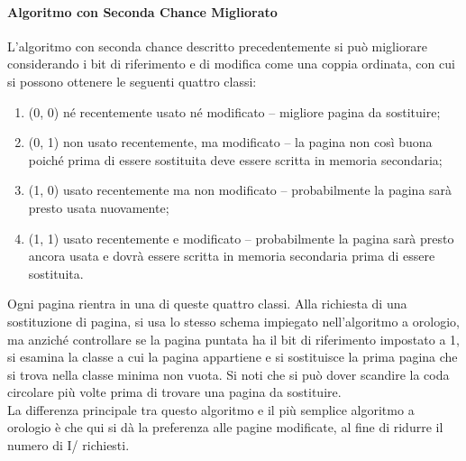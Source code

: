 \documentclass{article}
\begin{document}
				\paragraph{Algoritmo con Seconda Chance Migliorato\\}
					L’algoritmo con seconda chance descritto precedentemente si può migliorare considerando i bit di riferimento e di modifica come una coppia ordinata, con cui si possono ottenere le seguenti quattro classi:
					\begin{enumerate}
						\item (0, 0) né recentemente usato né modificato – migliore pagina da sostituire;
						\item (0, 1) non usato recentemente, ma modificato – la pagina non così buona poiché prima di essere sostituita deve essere scritta in memoria secondaria;
						\item (1, 0) usato recentemente ma non modificato – probabilmente la pagina sarà presto usata nuovamente;
						\item (1, 1) usato recentemente e modificato – probabilmente la pagina sarà presto ancora usata e dovrà essere scritta in memoria secondaria prima di essere sostituita.
					\end{enumerate}
					Ogni pagina rientra in una di queste quattro classi. Alla richiesta di una sostituzione di pagina, si usa lo stesso schema impiegato nell’algoritmo a orologio, ma anziché controllare se la pagina puntata ha il bit di riferimento impostato a 1, si esamina la classe a cui la pagina appartiene e si sostituisce la prima pagina che si trova nella classe minima non vuota. Si noti che si può dover scandire la coda circolare più volte prima di trovare una pagina da sostituire.
					\\La differenza principale tra questo algoritmo e il più semplice algoritmo a orologio è che qui si dà la preferenza alle pagine modificate, al fine di ridurre il numero di I/ richiesti.
\end{document}
